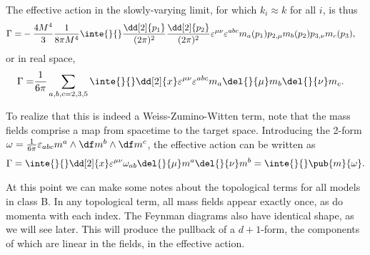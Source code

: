 The effective action in the slowly-varying limit, for which $k_{i} \approx k$ for all $i$, is thus
\begin{align*}
\Gamma =& -\frac{4M^{4}}{3}\frac{1}{8\pi M^{4}}\inte{}{}\frac{\dd[2]{p_{1}}}{(2\pi)^{2}}\frac{\dd[2]{p_{2}}}{(2\pi)^{2}}\varepsilon^{\mu\nu}\varepsilon^{abc}m_{a}(p_{1})p_{2, \mu}m_{b}(p_{2})p_{3, \nu}m_{c}(p_{3}),
\end{align*}
or in real space,
\begin{align*}
	\Gamma =& \frac{1}{6\pi}\sum\limits_{a, b, c = 2, 3, 5}\inte{}{}\dd[2]{x}\varepsilon^{\mu\nu}\varepsilon^{abc}m_{a}\del{}{\mu}m_{b}\del{}{\nu}m_{c}.
\end{align*}

To realize that this is indeed a Weiss-Zumino-Witten term, note that the mass fields comprise a map from spacetime to the target space. Introducing the 2-form $\omega = \frac{1}{6\pi}\varepsilon_{abc}m^{a}\wedge\df m^{b}\wedge\df m^{c}$, the effective action can be written as
\begin{align*}
	\Gamma = \inte{}{}\dd[2]{x}\varepsilon^{\mu\nu}\omega_{ab}\del{}{\mu}m^{a}\del{}{\nu}m^{b} = \inte{}{}\pub{m}{\omega}.
\end{align*}

At this point we can make some notes about the topological terms for all models in class B. In any topological term, all mass fields appear exactly once, as do momenta with each index. The Feynman diagrams also have identical shape, as we will see later. This will produce the pullback of a $d + 1$-form, the components of which are linear in the fields, in the effective action.

